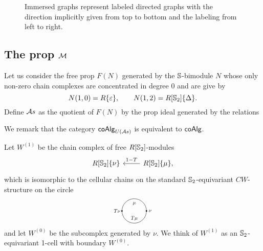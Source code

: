 \begin{figure}
	
	\caption{Immersed graphs represent labeled directed graphs with the direction implicitly given from top to bottom and the labeling from left to right.}
	\label{f:immersion}
\end{figure}

\subsection{The prop $\M$}\label{propM}

Let us consider the free prop $F(N)$ generated by the $\S$-bimodule $N$ whose only non-zero chain complexes are concentrated in degree $0$ and are give by
\begin{equation*}
N(1, 0) = R\{\varepsilon\}, \qquad
N(1, 2) = R[\S_2]\{\Delta\}.
\end{equation*}
Define $\A$ as the quotient of $F(N)$ by the prop ideal generated by the relations

We remark that the category $\coAlg_{U(\A)}$ is equivalent to $\coAlg$.

Let $W^{(1)}$ be the chain complex of free $R[\S_2]$-modules
\begin{equation*}
\begin{tikzcd}
R[\S_2]\{\nu\} &[0pt] \arrow[l, "1-T"'] R[\S_2]\{\mu\},
\end{tikzcd} 
\end{equation*}
which is isomorphic to the cellular chains on the standard $\S_2$-equivariant $CW$-structure on the circle
\begin{equation*}
\begin{tikzpicture}[scale=.85]
\draw (0,0) circle (20pt);
\node[scale=.7] at (0,12pt){$\mu$};
\node[scale=.7] at (0,-12pt){$T \mu$};
\node[scale=.7] at (-28pt,0){$T \nu$};
\node[scale=.7] at (26pt,0){$\nu$};
\draw [fill] (-20pt,0) circle [radius=1pt];
\draw [fill] (20pt,0) circle [radius=1pt];
\end{tikzpicture}
\end{equation*}
and let $W^{(0)}$ be the subcomplex generated by $\nu$. We think of $W^{(1)}$ as an $\S_2$-equivariant 1-cell with boundary $W^{(0)}$.

